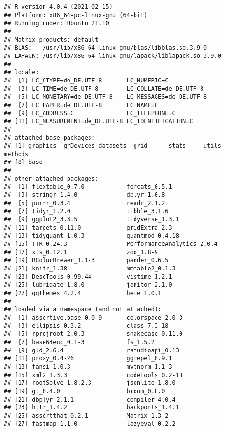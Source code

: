\documentclass[
]{article}
\begin{document}
\begin{verbatim}
## R version 4.0.4 (2021-02-15)
## Platform: x86_64-pc-linux-gnu (64-bit)
## Running under: Ubuntu 21.10
## 
## Matrix products: default
## BLAS:   /usr/lib/x86_64-linux-gnu/blas/libblas.so.3.9.0
## LAPACK: /usr/lib/x86_64-linux-gnu/lapack/liblapack.so.3.9.0
## 
## locale:
##  [1] LC_CTYPE=de_DE.UTF-8       LC_NUMERIC=C              
##  [3] LC_TIME=de_DE.UTF-8        LC_COLLATE=de_DE.UTF-8    
##  [5] LC_MONETARY=de_DE.UTF-8    LC_MESSAGES=de_DE.UTF-8   
##  [7] LC_PAPER=de_DE.UTF-8       LC_NAME=C                 
##  [9] LC_ADDRESS=C               LC_TELEPHONE=C            
## [11] LC_MEASUREMENT=de_DE.UTF-8 LC_IDENTIFICATION=C       
## 
## attached base packages:
## [1] graphics  grDevices datasets  grid      stats     utils     methods  
## [8] base     
## 
## other attached packages:
##  [1] flextable_0.7.0            forcats_0.5.1             
##  [3] stringr_1.4.0              dplyr_1.0.8               
##  [5] purrr_0.3.4                readr_2.1.2               
##  [7] tidyr_1.2.0                tibble_3.1.6              
##  [9] ggplot2_3.3.5              tidyverse_1.3.1           
## [11] targets_0.11.0             gridExtra_2.3             
## [13] tidyquant_1.0.3            quantmod_0.4.18           
## [15] TTR_0.24.3                 PerformanceAnalytics_2.0.4
## [17] xts_0.12.1                 zoo_1.8-9                 
## [19] RColorBrewer_1.1-3         pander_0.6.5              
## [21] knitr_1.38                 mmtable2_0.1.3            
## [23] DescTools_0.99.44          vistime_1.2.1             
## [25] lubridate_1.8.0            janitor_2.1.0             
## [27] ggthemes_4.2.4             here_1.0.1                
## 
## loaded via a namespace (and not attached):
##  [1] assertive.base_0.0-9       colorspace_2.0-3          
##  [3] ellipsis_0.3.2             class_7.3-18              
##  [5] rprojroot_2.0.3            snakecase_0.11.0          
##  [7] base64enc_0.1-3            fs_1.5.2                  
##  [9] gld_2.6.4                  rstudioapi_0.13           
## [11] proxy_0.4-26               ggrepel_0.9.1             
## [13] fansi_1.0.3                mvtnorm_1.1-3             
## [15] xml2_1.3.3                 codetools_0.2-18          
## [17] rootSolve_1.8.2.3          jsonlite_1.8.0            
## [19] gt_0.4.0                   broom_0.8.0               
## [21] dbplyr_2.1.1               compiler_4.0.4            
## [23] httr_1.4.2                 backports_1.4.1           
## [25] assertthat_0.2.1           Matrix_1.3-2              
## [27] fastmap_1.1.0              lazyeval_0.2.2            

\end{verbatim}
\end{document}
